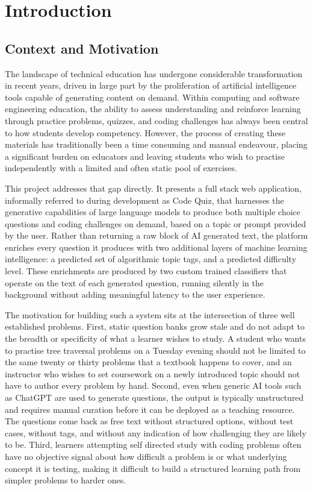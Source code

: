 \chapter{Introduction}

\section{Context and Motivation}

The landscape of technical education has undergone considerable transformation
in recent years, driven in large part by the proliferation of artificial
intelligence tools capable of generating content on demand. Within computing
and software engineering education, the ability to assess understanding and
reinforce learning through practice problems, quizzes, and coding challenges
has always been central to how students develop competency. However, the
process of creating these materials has traditionally been a time consuming
and manual endeavour, placing a significant burden on educators and leaving
students who wish to practise independently with a limited and often static
pool of exercises.

This project addresses that gap directly. It presents a full stack web
application, informally referred to during development as Code Quiz, that harnesses the generative capabilities of large language
models \cite{brown2020gpt3} to produce both multiple choice questions and
coding challenges on demand, based on a topic or prompt provided by the user.
Rather than returning a raw block of AI generated text, the platform enriches
every question it produces with two additional layers of machine learning
intelligence: a predicted set of algorithmic topic tags, and a predicted
difficulty level. These enrichments are produced by two custom trained
classifiers that operate on the text of each generated question, running
silently in the background without adding meaningful latency to the user
experience.

The motivation for building such a system sits at the intersection of three
well established problems. First, static question banks grow stale and do
not adapt to the breadth or specificity of what a learner wishes to study.
A student who wants to practise tree traversal problems on a Tuesday evening
should not be limited to the same twenty or thirty problems that a textbook
happens to cover, and an instructor who wishes to set coursework on a newly
introduced topic should not have to author every problem by hand. Second,
even when generic AI tools such as ChatGPT are used to generate questions,
the output is typically unstructured and requires manual curation before it
can be deployed as a teaching resource. The questions come back as free text
without structured options, without test cases, without tags, and without any
indication of how challenging they are likely to be. Third, learners
attempting self directed study with coding problems often have no objective
signal about how difficult a problem is or what underlying concept it is
testing, making it difficult to build a structured learning path from
simpler problems to harder ones.

